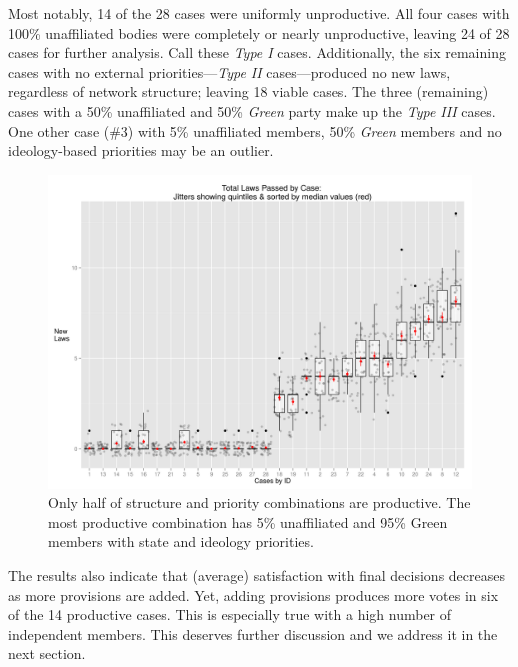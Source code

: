 \documentclass[pdftex,12pt]{llncs}
\begin{document}
Most notably, 14 of the 28 cases were uniformly unproductive.
All four cases with 100\% unaffiliated bodies were completely or nearly unproductive, leaving 24 of 28 cases for further analysis.
Call these \textit{Type I} cases.
Additionally, the six remaining cases with no external priorities---\textit{Type II} cases---produced no new laws, regardless of network structure; leaving 18 viable cases.
The three (remaining) cases with a 50\% unaffiliated and 50\% \textit{Green} party make up the \textit{Type III} cases.
One other case (\#3) with 5\% unaffiliated members, 50\% \textit{Green} members and no ideology-based priorities may be an outlier. 

\begin{figure}[hb]
\centering
\includegraphics[width=4.75in]{laws_byJob_jitterQuints.png}
\caption[ ]{Only half of structure and priority combinations are productive. The most productive combination has 5\% unaffiliated and 95\% Green members with state and ideology priorities.} 
\label{lawspassed}
\end{figure}
 
  
The results also indicate that (average) satisfaction with final decisions decreases as more provisions are added.
Yet, adding provisions produces more votes in six of the 14 productive cases. 
This is especially true with a high number of independent members.  
This deserves further discussion and we address it in the next section.

\end{document}
